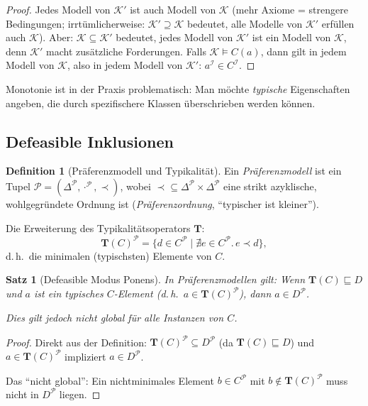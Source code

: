 ﻿\documentclass[a4paper,12pt]{article}
\theoremstyle{definition}
\newtheorem{definition}{Definition}[section]
\theoremstyle{plain}
\newtheorem{satz}{Satz}[section]
\theoremstyle{remark}
\newcommand{\KB}{\ensuremath{\mathcal{K}}}
\newcommand{\interp}[1]{\ensuremath{\mathcal{#1}}}
\newcommand{\Dom}[1]{\ensuremath{\Delta^{\interp{#1}}}}
\begin{document}
\begin{proof}
Jedes Modell von $\KB'$ ist auch Modell von $\KB$
(mehr Axiome = strengere Bedingungen; irrt{\"{u}}mlicherweise:
$\KB' \supseteq \KB$ bedeutet, alle Modelle von $\KB'$ erf{\"{u}}llen auch $\KB$).
Aber: $\KB \subseteq \KB'$ bedeutet, jedes Modell von $\KB'$
ist ein Modell von $\KB$, denn $\KB'$ macht zus{\"{a}}tzliche Forderungen.
Falls $\KB \models C(a)$, dann gilt in jedem Modell von $\KB$,
also in jedem Modell von $\KB'$: $a^\interp{I} \in C^\interp{I}$.
\qedhere
\end{proof}

Monotonie ist in der Praxis problematisch: Man m{\"{o}}chte
\emph{typische} Eigenschaften angeben, die durch spezifischere
Klassen {\"{u}}berschrieben werden k{\"{o}}nnen.

\subsection{Defeasible Inklusionen}

\begin{definition}[Pr{\"{a}}ferenzmodell und Typikalit{\"{a}}t]
Ein \emph{Pr{\"{a}}ferenzmodell} ist ein Tupel
$\interp{P} = (\Dom{P}, \cdot^\interp{P}, \prec)$,
wobei $\prec \subseteq \Dom{P} \times \Dom{P}$
eine strikt azyklische, wohlgegr{\"{u}}ndete Ordnung ist
(\emph{Pr{\"{a}}ferenzordnung}, ``typischer ist kleiner'').

Die Erweiterung des Typikalit{\"{a}}tsoperators $\mathbf{T}$:
\[
  \mathbf{T}(C)^\interp{P} =
  \bigl\{d \in C^\interp{P} \;\big|\;
  \nexists e \in C^\interp{P}.\, e \prec d\bigr\},
\]
d.\,h.\ die minimalen (typischsten) Elemente von $C$.
\end{definition}

\begin{satz}[Defeasible Modus Ponens]
\label{satz:defeasible-mp}
In Pr{\"{a}}ferenzmodellen gilt:
Wenn $\mathbf{T}(C) \sqsubseteq D$ und $a$ ist
ein typisches $C$-Element (d.\,h.\ $a \in \mathbf{T}(C)^\interp{P}$),
dann $a \in D^\interp{P}$.

Dies gilt jedoch \emph{nicht global} f{\"{u}}r alle Instanzen von $C$.
\end{satz}

\begin{proof}
Direkt aus der Definition: $\mathbf{T}(C)^\interp{P} \subseteq D^\interp{P}$
(da $\mathbf{T}(C) \sqsubseteq D$) und $a \in \mathbf{T}(C)^\interp{P}$
impliziert $a \in D^\interp{P}$.

Das ``nicht global'': Ein nichtminimales Element $b \in C^\interp{P}$
mit $b \notin \mathbf{T}(C)^\interp{P}$ muss nicht in $D^\interp{P}$
liegen.
\end{proof}
\end{document}
